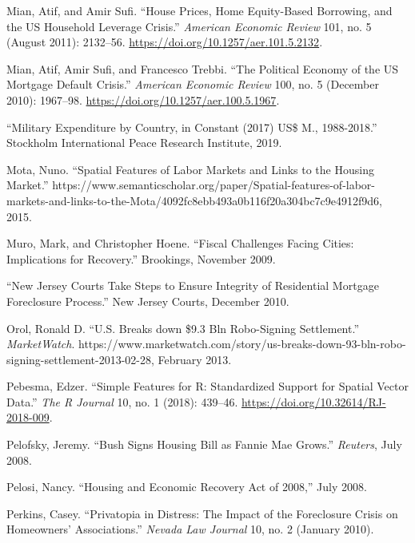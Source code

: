 \documentclass[12pt,oneside]{psthesis}
\begin{document}
\leavevmode\hypertarget{ref-mian2011house}{}%
Mian, Atif, and Amir Sufi. ``House Prices, Home Equity-Based Borrowing, and the US Household Leverage Crisis.'' \emph{American Economic Review} 101, no. 5 (August 2011): 2132--56. \url{https://doi.org/10.1257/aer.101.5.2132}.

\leavevmode\hypertarget{ref-mianPoliticalEconomyUS2010}{}%
Mian, Atif, Amir Sufi, and Francesco Trebbi. ``The Political Economy of the US Mortgage Default Crisis.'' \emph{American Economic Review} 100, no. 5 (December 2010): 1967--98. \url{https://doi.org/10.1257/aer.100.5.1967}.

\leavevmode\hypertarget{ref-2019military}{}%
``Military Expenditure by Country, in Constant (2017) US\$ M., 1988-2018.'' Stockholm International Peace Research Institute, 2019.

\leavevmode\hypertarget{ref-mota2015spatial}{}%
Mota, Nuno. ``Spatial Features of Labor Markets and Links to the Housing Market.'' https://www.semanticscholar.org/paper/Spatial-features-of-labor-markets-and-links-to-the-Mota/4092fc8ebb493a0b116f20a304bc7c9e4912f9d6, 2015.

\leavevmode\hypertarget{ref-muro2009fiscal}{}%
Muro, Mark, and Christopher Hoene. ``Fiscal Challenges Facing Cities: Implications for Recovery.'' Brookings, November 2009.

\leavevmode\hypertarget{ref-comfort2010new}{}%
``New Jersey Courts Take Steps to Ensure Integrity of Residential Mortgage Foreclosure Process.'' New Jersey Courts, December 2010.

\leavevmode\hypertarget{ref-orol2013breaks}{}%
Orol, Ronald D. ``U.S. Breaks down \$9.3 Bln Robo-Signing Settlement.'' \emph{MarketWatch}. https://www.marketwatch.com/story/us-breaks-down-93-bln-robo-signing-settlement-2013-02-28, February 2013.

\leavevmode\hypertarget{ref-pebesma2018simple}{}%
Pebesma, Edzer. ``Simple Features for R: Standardized Support for Spatial Vector Data.'' \emph{The R Journal} 10, no. 1 (2018): 439--46. \url{https://doi.org/10.32614/RJ-2018-009}.

\leavevmode\hypertarget{ref-pelofsky2008bush}{}%
Pelofsky, Jeremy. ``Bush Signs Housing Bill as Fannie Mae Grows.'' \emph{Reuters}, July 2008.

\leavevmode\hypertarget{ref-pelosi2008housing}{}%
Pelosi, Nancy. ``Housing and Economic Recovery Act of 2008,'' July 2008.

\leavevmode\hypertarget{ref-perkins2010privatopia}{}%
Perkins, Casey. ``Privatopia in Distress: The Impact of the Foreclosure Crisis on Homeowners' Associations.'' \emph{Nevada Law Journal} 10, no. 2 (January 2010).
\end{document}
